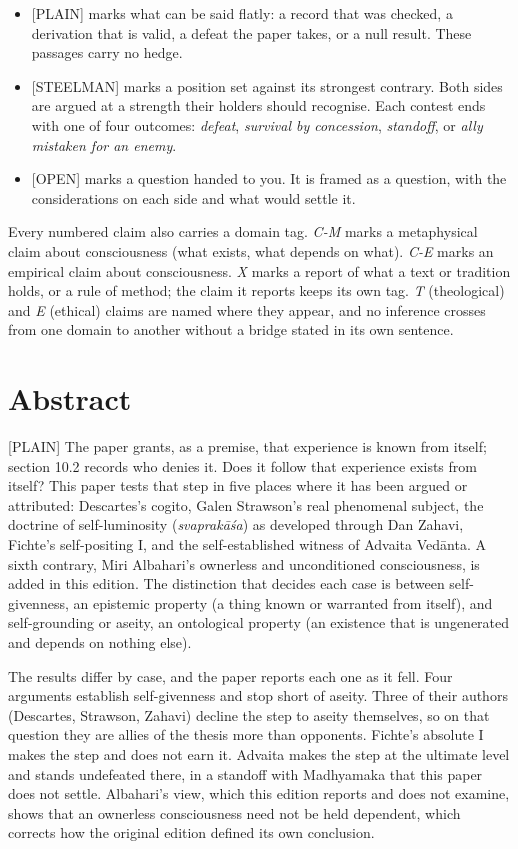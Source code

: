 \documentclass[11pt]{article}
\newcommand{\register}[1]{{\ttfamily\small #1}}
\begin{document}
\begin{itemize}
\item \register{[PLAIN]} marks what can be said flatly: a record that was checked, a derivation that is valid, a defeat the paper takes, or a null result. These passages carry no hedge.
\item \register{[STEELMAN]} marks a position set against its strongest contrary. Both sides are argued at a strength their holders should recognise. Each contest ends with one of four outcomes: \emph{defeat}, \emph{survival by concession}, \emph{standoff}, or \emph{ally mistaken for an enemy}.
\item \register{[OPEN]} marks a question handed to you. It is framed as a question, with the considerations on each side and what would settle it.
\end{itemize}
Every numbered claim also carries a domain tag. \emph{C-M} marks a metaphysical claim about consciousness (what exists, what depends on what). \emph{C-E} marks an empirical claim about consciousness. \emph{X} marks a report of what a text or tradition holds, or a rule of method; the claim it reports keeps its own tag. \emph{T} (theological) and \emph{E} (ethical) claims are named where they appear, and no inference crosses from one domain to another without a bridge stated in its own sentence.

\section*{Abstract}

\register{[PLAIN]} The paper grants, as a premise, that experience is known from itself; section 10.2 records who denies it. Does it follow that experience exists from itself? This paper tests that step in five places where it has been argued or attributed: Descartes's cogito, Galen Strawson's real phenomenal subject, the doctrine of self-luminosity (\emph{svaprakāśa}) as developed through Dan Zahavi, Fichte's self-positing I, and the self-established witness of Advaita Vedānta. A sixth contrary, Miri Albahari's ownerless and unconditioned consciousness, is added in this edition. The distinction that decides each case is between self-givenness, an epistemic property (a thing known or warranted from itself), and self-grounding or aseity, an ontological property (an existence that is ungenerated and depends on nothing else).

The results differ by case, and the paper reports each one as it fell. Four arguments establish self-givenness and stop short of aseity. Three of their authors (Descartes, Strawson, Zahavi) decline the step to aseity themselves, so on that question they are allies of the thesis more than opponents. Fichte's absolute I makes the step and does not earn it. Advaita makes the step at the ultimate level and stands undefeated there, in a standoff with Madhyamaka that this paper does not settle. Albahari's view, which this edition reports and does not examine, shows that an ownerless consciousness need not be held dependent, which corrects how the original edition defined its own conclusion.
\end{document}
